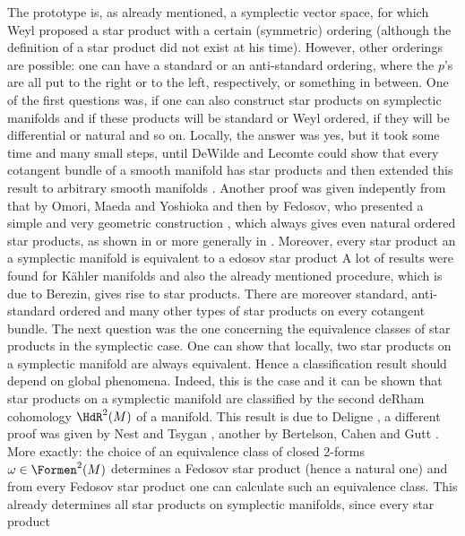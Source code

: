 The prototype is, as already mentioned, a symplectic vector space, for which 
Weyl proposed a star product with a certain (symmetric) ordering (although the 
definition of a star product did not exist at his time). However, other 
orderings are possible: one can have a standard or an anti-standard ordering, 
where the $p$'s are all put to the right or to the left, respectively, or 
something in  between. One of the first questions was, if one can also construct 
star products on symplectic manifolds and if these products will be standard or 
Weyl ordered, if they will be differential or natural and so on. Locally, the 
answer was yes, but it took some time and many small steps, until DeWilde and 
Lecomte could show that every cotangent bundle of a smooth manifold has star 
products \cite{dewilde.lecomte:1983a} and then extended this result to arbitrary 
smooth manifolds \cite{dewilde.lecomte:1983b}. Another proof was given 
indepently from that by Omori, Maeda and Yoshioka 
\cite{omori.maeda.yoshioka:1991a} and then by Fedosov, who presented a simple 
and very geometric construction \cite{fedosov:1994a}, which always gives even 
natural ordered star products, as shown in \cite{bordemann.waldmann:1997a} 
or more generally in \cite{gutt.rawnsley:2003a}. Moreover, every star product an a 
symplectic manifold is equivalent to a edosov star product 
\cite{beretlson.cahen.gutt:1997a} A lot of 
results were found for K\"ahler manifolds and also the already mentioned 
procedure, which is due to Berezin, gives rise to star products. There are 
moreover standard, anti-standard ordered and many other types of star products 
on every cotangent bundle. The next question was the one concerning the 
equivalence classes of star products in the symplectic case. One can show that 
locally, two star products on a symplectic manifold are always equivalent. Hence 
a classification result should depend on global phenomena. Indeed, this is the 
case and it can be shown that star products on a symplectic manifold are 
classified by the second deRham cohomology $\HdR^2(M)$ of a manifold. This 
result is due to Deligne \cite{deligne:1995a}, a different proof was given by 
Nest and Tsygan \cite{nest.tsygan:1995a, nest.tsygan:1995a}, another by 
Bertelson, Cahen and Gutt \cite{bertelson.cahen.gutt:1997a}. More exactly: the 
choice of an equivalence class of closed 2-forms $\omega \in \Formen^2(M)$ 
determines a Fedosov star product (hence a natural one) and from every Fedosov 
star product one can calculate such an equivalence class. This already 
determines all star products on symplectic manifolds, since every star product 

